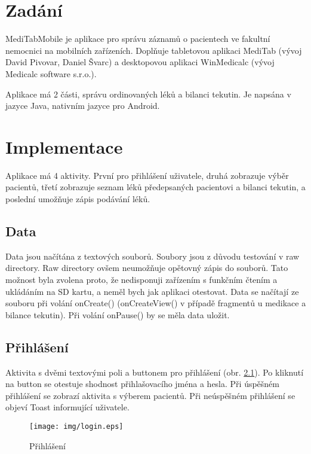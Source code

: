 \setlength{\parskip}{1em}

\chapter{Zadání}

MediTabMobile je aplikace pro správu záznamů o pacientech ve fakultní nemocnici na mobilních zařízeních. Doplňuje tabletovou aplikaci MediTab (vývoj David Pivovar, Daniel Švarc) a desktopovou aplikaci WinMedicalc (vývoj Medicalc software s.r.o.).

Aplikace má 2 části, správu ordinovaných léků a bilanci tekutin. Je napsána v jazyce Java, nativním jazyce pro Android.



\chapter{Implementace}

Aplikace má 4 aktivity. První pro přihlášení uživatele, druhá zobrazuje výběr pacientů, třetí zobrazuje seznam léků předepsaných pacientovi a bilanci tekutin, a poslední umožňuje zápis podávání léků.

\section{Data}

Data jsou načítána z textových souborů. Soubory jsou z důvodu testování v raw directory. Raw directory ovšem neumožňuje opětovný zápis do souborů. Tato možnost byla zvolena proto, že nedisponuji zařízením s funkčním čtením a ukládáním na SD kartu, a neměl bych jak aplikaci otestovat. Data se načítají ze souboru při volání onCreate() (onCreateView() v případě fragmentů u medikace a bilance tekutin). Při volání onPause() by se měla data uložit.

\section{Přihlášení}

Aktivita s dvěmi textovými poli a buttonem pro přihlášení (obr. \ref{login}). Po kliknutí na button se otestuje shodnost přihlašovacího jména a hesla. Při úspěšném přihlášení se zobrazí aktivita s výberem pacientů. Při neúspěšném přihlášení se objeví Toast informující uživatele.

\begin{figure}[H]
	\centering
	\texttt{[image: img/login.eps]}
	\caption{Přihlášení}
  \label{login}
\end{figure}



